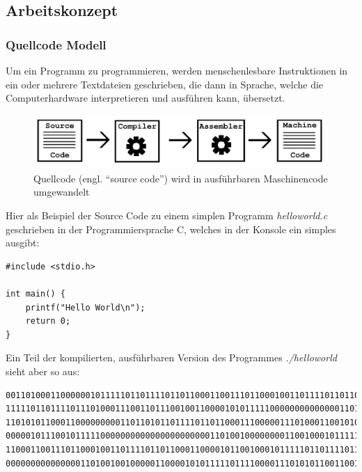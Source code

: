 \documentclass[a4paper,11pt]{article}
\begin{document}
\subsection{Arbeitskonzept}

\subsubsection{Quellcode Modell}
Um ein Programm zu programmieren, werden menschenlesbare Instruktionen in ein oder mehrere Textdateien geschrieben,
die dann in Sprache, welche die Computerhardware interpretieren und ausführen kann, übersetzt.

\begin{figure}[H]
    \centering
    \includegraphics[width=.8\textwidth]{media/Source2Executable.jpg}
    \caption{Quellcode (engl. ``source code'') wird in ausführbaren Maschinencode umgewandelt \cite{stallman2002}}
\end{figure}

Hier als Beispiel der Source Code zu einem simplen Programm \textit{helloworld.c} geschrieben in der Programmiersprache C, welches in der Konsole ein simples  ausgibt:

\lstset{language=C}
\begin{lstlisting}
#include <stdio.h>

int main() {
    printf("Hello World\n");
    return 0;
}
\end{lstlisting}
Ein Teil der kompilierten, ausführbaren Version des Programmes \textit{./helloworld} sieht aber so aus:
\begin{lstlisting}
0011010001100000010111110110111101101100011001110110001001101111011011000110000101100100010
1111101101111011101000111001101110010011000010101111100000000000000110100011100000111100001
1101010110001100000000011011010110111101101100011100000111010001100101011001000110010100110
0000010111001011111000000000000000000000011010010000000011001000101111101011111011011110110
1100011001110110001001101111011011000110000101100100010111110110111101110100011100110111001
0000000000000001101001001000001100001010111110111100001110101011001100101111101101110011010
\end{lstlisting}
\end{document}
